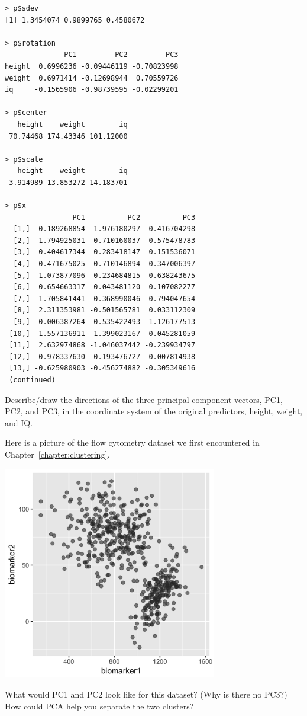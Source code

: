 \begin{multicols}{2}
{\scriptsize
\begin{verbatim}
> p$sdev
[1] 1.3454074 0.9899765 0.4580672

> p$rotation
              PC1         PC2         PC3
height  0.6996236 -0.09446119 -0.70823998
weight  0.6971414 -0.12698944  0.70559726
iq     -0.1565906 -0.98739595 -0.02299201

> p$center
   height    weight        iq 
 70.74468 174.43346 101.12000 
 
> p$scale
   height    weight        iq 
 3.914989 13.853272 14.183701 
 
> p$x
                PC1          PC2          PC3
  [1,] -0.189268854  1.976180297 -0.416704298
  [2,]  1.794925031  0.710160037  0.575478783
  [3,] -0.404617344  0.283418147  0.151536071
  [4,] -0.471675025 -0.710146894  0.347006397
  [5,] -1.073877096 -0.234684815 -0.638243675
  [6,] -0.654663317  0.043481120 -0.107082277
  [7,] -1.705841441  0.368990046 -0.794047654
  [8,]  2.311353981 -0.501565781  0.033112309
  [9,] -0.006387264 -0.535422493 -1.126177513
 [10,] -1.557136911  1.399023167 -0.045281059
 [11,]  2.632974868 -1.046037442 -0.239934797
 [12,] -0.978337630 -0.193476727  0.007814938
 [13,] -0.625980903 -0.456274882 -0.305349616
 (continued)
\end{verbatim}
}
\end{multicols}

\begin{question}{}
Describe/draw the directions of the three principal component vectors, PC1, PC2, and PC3, in the coordinate system of the original predictors, height, weight, and IQ.
\end{question}

\begin{question}{}
Here is a picture of the flow cytometry dataset we first encountered in Chapter~\ref{chapter:clustering}.
\begin{center}
\includegraphics[width=0.7\textwidth]{img/biomarker-data-big-no-labels.png}
\end{center}
What would PC1 and PC2 look like for this dataset? (Why is there no PC3?) How could PCA help you separate the two clusters?
\end{question}

